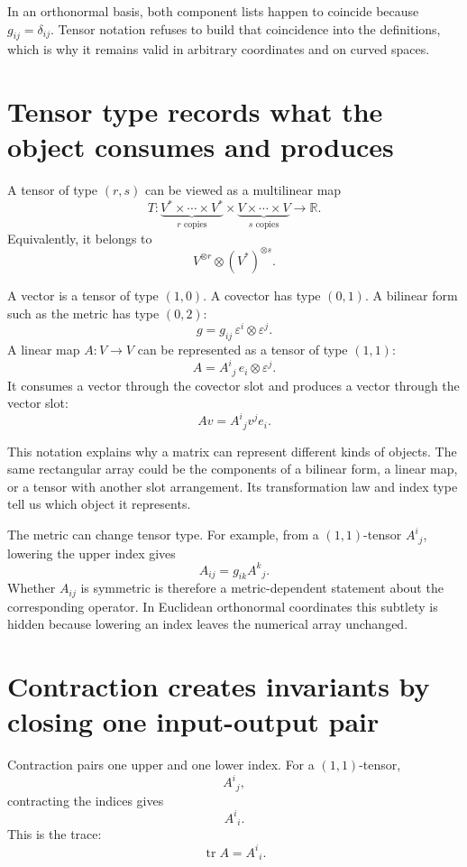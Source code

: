 In an orthonormal basis, both component lists happen to coincide because \(g_{ij}=\delta_{ij}\).  Tensor notation refuses to build that coincidence into the definitions, which is why it remains valid in arbitrary coordinates and on curved spaces.

\section{Tensor type records what the object consumes and produces}

A tensor of type \((r,s)\) can be viewed as a multilinear map
\[
  T:
  \underbrace{V^*\times\cdots\times V^*}_{r\text{ copies}}
  \times
  \underbrace{V\times\cdots\times V}_{s\text{ copies}}
  \longrightarrow\mathbb R.
\]
Equivalently, it belongs to
\[
  V^{\otimes r}\otimes(V^*)^{\otimes s}.
\]

A vector is a tensor of type \((1,0)\).  A covector has type \((0,1)\).  A bilinear form such as the metric has type \((0,2)\):
\[
  g=g_{ij}\,\varepsilon^i\otimes\varepsilon^j.
\]
A linear map \(A:V\to V\) can be represented as a tensor of type \((1,1)\):
\[
  A=A^i{}_j\,e_i\otimes\varepsilon^j.
\]
It consumes a vector through the covector slot and produces a vector through the vector slot:
\[
  Av=A^i{}_jv^j e_i.
\]

This notation explains why a matrix can represent different kinds of objects.  The same rectangular array could be the components of a bilinear form, a linear map, or a tensor with another slot arrangement.  Its transformation law and index type tell us which object it represents.

The metric can change tensor type.  For example, from a \((1,1)\)-tensor \(A^i{}_j\), lowering the upper index gives
\[
  A_{ij}=g_{ik}A^k{}_j.
\]
Whether \(A_{ij}\) is symmetric is therefore a metric-dependent statement about the corresponding operator.  In Euclidean orthonormal coordinates this subtlety is hidden because lowering an index leaves the numerical array unchanged.

\section{Contraction creates invariants by closing one input-output pair}

Contraction pairs one upper and one lower index.  For a \((1,1)\)-tensor,
\[
  A^i{}_j,
\]
contracting the indices gives
\[
  A^i{}_i.
\]
This is the trace:
\[
  \operatorname{tr}A=A^i{}_i.
\]

